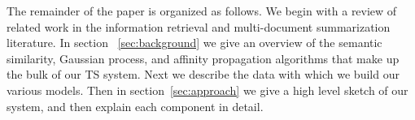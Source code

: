 


The remainder of the paper is organized as follows. We begin with a review of related work in the information retrieval and multi-document summarization literature.  In section
~\ref{sec:background} we give an overview of the semantic similarity,
Gaussian process, and affinity propagation algorithms that make up the bulk of
our TS system. 
Next we describe the data with which we build our various models.
Then in section~\ref{sec:approach} we give a high level sketch
of our system, and then explain each component in detail. 
